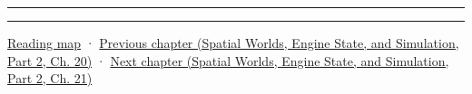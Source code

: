 \begin{center}\rule{0.5\linewidth}{0.5pt}\end{center}

\begin{center}\rule{0.5\linewidth}{0.5pt}\end{center}

\hyperref[volume-reading-map]{Reading map} · \href{../05-Spatial-Worlds-Engine-State-and-Simulation-P02/main.pdf\#nameddest=06-engine-ii-ch029-dynamic-spatial-indices-for-moving-worlds}{Previous chapter (Spatial Worlds, Engine State, and Simulation, Part 2, Ch. 20)} · \href{../05-Spatial-Worlds-Engine-State-and-Simulation-P02/main.pdf\#nameddest=06-engine-ii-ch031-spatial-index-serialization-and-query-evidence}{Next chapter (Spatial Worlds, Engine State, and Simulation, Part 2, Ch. 21)}
